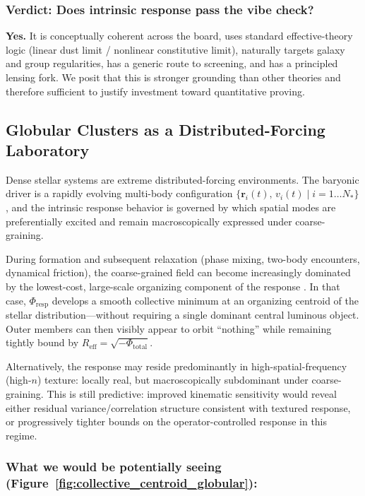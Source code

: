 \subsubsection{Verdict: Does intrinsic response pass the vibe check?}

\textbf{Yes.} It is conceptually coherent across the board, uses standard effective-theory 
logic (linear dust limit / nonlinear constitutive limit), naturally targets galaxy and group 
regularities, has a generic route to screening, and has a principled lensing fork. We posit 
that this is stronger grounding than other theories and therefore sufficient to justify 
investment toward quantitative proving.

\subsection{Globular Clusters as a Distributed-Forcing Laboratory}\label{e.5-globular-clusters}

Dense stellar systems are extreme distributed-forcing environments. The baryonic driver is 
a rapidly evolving multi-body configuration $\{\mathbf{r}_i(t), \, v_i(t) \mid i = 1 \ldots N_*\}$, 
and the intrinsic response behavior is governed by which spatial modes are preferentially 
excited and remain macroscopically expressed under coarse-graining.

During formation and subsequent relaxation (phase mixing, two-body encounters, dynamical 
friction), the coarse-grained field can become increasingly dominated by the lowest-cost, 
large-scale organizing component of the response \citep{BullockBoylanKolchin2017SmallScale}. In that case, $\Phi_{\text{resp}}$ develops 
a smooth collective minimum at an organizing centroid of the stellar distribution---without 
requiring a single dominant central luminous object. Outer members can then visibly appear 
to orbit ``nothing'' while remaining tightly bound by $R_{\text{eff}} = \sqrt{-\Phi_{\text{total}}}$.

Alternatively, the response may reside predominantly in high-spatial-frequency (high-$n$) 
texture: locally real, but macroscopically subdominant under coarse-graining. This is still 
predictive: improved kinematic sensitivity would reveal either residual variance/correlation 
structure consistent with textured response, or progressively tighter bounds on the 
operator-controlled response in this regime.

\subsubsection{What we would be potentially seeing (Figure~\ref{fig:collective_centroid_globular}):}

